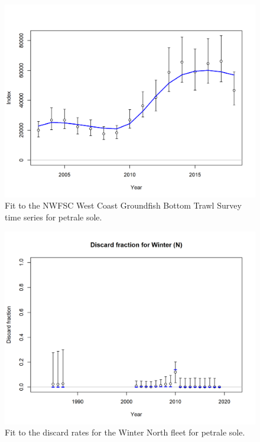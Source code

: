 \documentclass[12pt,]{article}
\begin{document}
\FloatBarrier 

\begin{figure}
\centering
\includegraphics{r4ss/plots_mod1/index2_cpuefit_NWFSC West Coast Groundfish Bottom Trawl Survey.png}
\caption{Fit to the NWFSC West Coast Groundfish Bottom Trawl Survey time
series for petrale sole. \label{fig:fit_nwfsc_survey}}
\end{figure}

\FloatBarrier

\begin{figure}
\centering
\includegraphics{r4ss/plots_mod1/discard_fitWinter (N).png}
\caption{Fit to the discard rates for the Winter North fleet for petrale
sole. \label{fig:fit_wn_discard}}
\end{figure}
\end{document}
